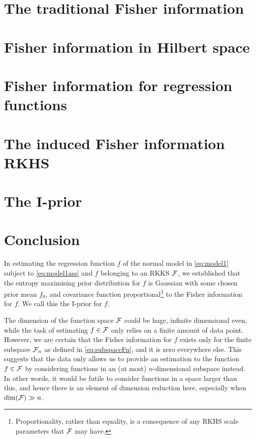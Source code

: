 \documentclass[showframe,11pt,twoside,openright]{report}
\begin{document}
\section{The traditional Fisher information}


\section{Fisher information in Hilbert space}
\label{sec:fihilbert}


\section{Fisher information for regression functions}
\label{sec:firegfun}


\section{The induced Fisher information RKHS}
\label{sec:inducedFisherRKHS}


\section{The I-prior}


\section{Conclusion}

In estimating the regression function $f$ of the normal model in \cref{eq:model1} subject to \cref{eq:model1ass} and $f$ belonging to an RKKS ${\mathcal F}$, we established that the entropy maximising prior distribution for $f$ is Gaussian with some chosen prior mean $f_0$, and covariance function proportional\footnote{Proportionality, rather than equality, is a consequence of any RKHS scale parameters that ${\mathcal F}$ may have.} to the Fisher information for $f$.
We call this the I-prior for $f$.

The dimension of the function space ${\mathcal F}$ could be huge, infinite dimensional even, while the task of estimating $f\in{\mathcal F}$ only relies on a finite amount of data point.
However, we are certain that the Fisher information for $f$ exists only for the finite subspace ${\mathcal F}_n$ as defined in \cref{eq:subspaceFn}, and it is zero everywhere else.
This suggests that the data only allows us to provide an estimation to the function $f\in{\mathcal F}$ by considering functions in an (at most) $n$-dimensional subspace instead.
In other words, it would be futile to consider functions in a space larger than this, and hence there is an element of dimension reduction here, especially when $\dim({\mathcal F}) \gg n$.
\end{document}
